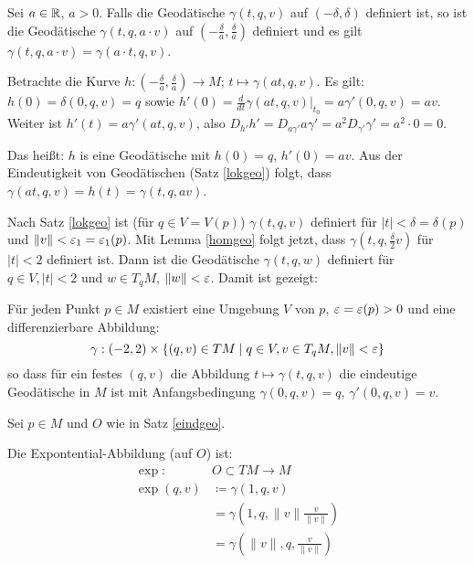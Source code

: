 \documentclass[a4paper,twoside,DIV15,BCOR12mm]{scrbook}
\renewcommand{\da}{\coloneqq}
\begin{document}
\begin{lemma}
\label{homgeo}
Sei $a\in \mathbb{R}$, $a>0$. Falls die Geodätische $\gamma(t,q,v)$ auf $(-\delta,\delta)$ definiert ist, so ist die Geodätische $\gamma(t,q,a\cdot v)$ auf $(-\frac \delta a, \frac \delta a)$ definiert und es gilt $\gamma(t,q,a\cdot v) = \gamma(a\cdot t, q ,v)$.
\end{lemma}

\begin{beweis}
Betrachte die Kurve $h: (-\frac \delta a, \frac \delta a) \to M$; $t\mapsto \gamma(at,q,v)$. Es gilt: $h(0)= \delta(0,q,v) = q$ sowie $h'(0) = \frac d{dt}\gamma(at,q,v)|_{t_0} = a \gamma'(0,q,v) = av$. Weiter ist $h'(t) = a\gamma'(at,q,v)$, also $D_{h'}h' = D_{a\gamma'}a\gamma' = a^2 D_{\gamma'}\gamma' = a^2\cdot 0 = 0.$

Das heißt: $h$ is eine Geodätische mit $h(0) = q$, $h'(0)=av$. Aus der Eindeutigkeit von Geodätischen (Satz \ref{lokgeo}) folgt, dass $\gamma(at,q,v) = h(t) = \gamma(t,q,av)$.
\end{beweis}

Nach Satz \ref{lokgeo} ist (für $q\in V=V(p)$) $\gamma(t,q,v)$ definiert für $|t|<\delta=\delta(p)$ und $\|v\| < \varepsilon_1=\varepsilon_1(p)$. Mit Lemma \ref{homgeo} folgt jetzt, dass $\gamma(t,q,\frac \delta 2 v)$ für $|t|<2$ definiert ist. Dann ist die Geodätische $\gamma(t,q,w)$ definiert für $q\in V, |t|<2$ und $w\in T_qM$, $\|w\|<\varepsilon$. Damit ist gezeigt: 
\begin{satz}
\label{eindgeo}
Für jeden Punkt $p\in M$ existiert eine Umgebung $V$ von $p$, $\varepsilon = \varepsilon(p)>0$ und eine differenzierbare Abbildung:
\[
\gamma: (-2,2) \times \{(q,v)\in TM \mid q\in V, v\in T_qM, \|v\| < \varepsilon \}
\]
so dass für ein festes $(q,v)$ die Abbildung $t\mapsto \gamma(t,q,v)$ die eindeutige Geodätische in $M$ ist mit Anfangsbedingung $\gamma(0,q,v) = q$, $\gamma'(0,q,v) = v$.
\end{satz}

Sei $p\in M$ und $O$ wie in Satz \ref{eindgeo}.
\begin{definition}
Die Expontential-Abbildung (auf $O$) ist:
\begin{align*}
\exp :\quad &O \subset TM \to M\\
\exp(q,v) &\da \gamma(1,q,v) \\
&= \gamma(1,q,\|v\| \frac v {\|v\|}) \\
&= \gamma(\|v\|,q,\frac v {\|v\|})
\end{align*}
\end{definition}
\end{document}
